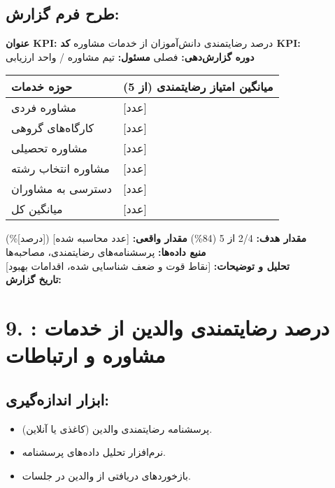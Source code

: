 \documentclass[11pt]{article}
\begin{document}
\subsection*{طرح فرم گزارش:}
\noindent\textbf{عنوان KPI:} درصد رضایتمندی دانش‌آموزان از خدمات مشاوره \hfill \textbf{کد KPI:}  \\
\noindent\textbf{دوره گزارش‌دهی:} فصلی \hfill \textbf{مسئول:} تیم مشاوره / واحد ارزیابی \\

\bigskip
\begin{tabular}{ll}
\textbf{حوزه خدمات} & \textbf{میانگین امتیاز رضایتمندی (از 5)} \\
\hline
مشاوره فردی & {[عدد]} \\
کارگاه‌های گروهی & {[عدد]} \\
مشاوره تحصیلی & {[عدد]} \\
مشاوره انتخاب رشته & {[عدد]} \\
دسترسی به مشاوران & {[عدد]} \\
میانگین کل & {[عدد]} \\
\end{tabular}
\bigskip

\noindent\textbf{مقدار هدف:} 2/4 از 5 (84\%) \hfill \textbf{مقدار واقعی:} {[عدد محاسبه شده]} ({[درصد]\%}) \\
\noindent\textbf{منبع داده‌ها:} پرسشنامه‌های رضایتمندی، مصاحبه‌ها \\
\noindent\textbf{تحلیل و توضیحات:} {[نقاط قوت و ضعف شناسایی شده، اقدامات بهبود]} \\
\noindent\textbf{تاریخ گزارش:} \\

\hrulefill
\bigskip

\section*{9. : درصد رضایتمندی والدین از خدمات مشاوره و ارتباطات}

\subsection*{ابزار اندازه‌گیری:}
\begin{itemize}
    \item پرسشنامه رضایتمندی والدین (کاغذی یا آنلاین).
    \item نرم‌افزار تحلیل داده‌های پرسشنامه.
    \item بازخوردهای دریافتی از والدین در جلسات.
\end{itemize}
\end{document}
